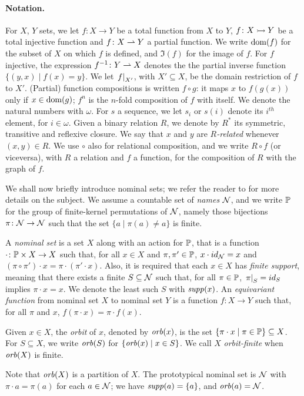 \paragraph{Notation.} For $X$, $Y$ sets, we let $f \colon X \to Y$ be a total function from $X$ to $Y$, $f \colon X \rightarrowtail Y$ be a total injective function and $f \colon X \rightharpoonup Y$ a partial function. We write $\operatorname{dom}(f)$ for the subset of $X$ on which $f$ is defined, and $\Im(f)$ for the image of $f$. For $f$ injective, the expression $f^{-1} \colon Y \rightharpoonup X$ denotes the the partial inverse function $\{(y,x) \mid f(x) = y \}$. We let $\left.f\right|_{X'}$, with $X' \subseteq X$, be the domain restriction of $f$ to $X'$. (Partial) function compositions is written $f \circ g$: it maps $x$ to $f(g(x))$ only if $x \in \operatorname{dom}(g)$; $f^n$ is the $n$-fold composition of $f$ with itself. We denote the natural numbers with $\omega$. For $s$ a sequence, we let $s_i$ or $s(i)$ denote its $i^{\mathit{th}}$ element, for $i \in \omega$. Given a binary relation $R$, we denote by $R^*$ its symmetric, transitive and reflexive closure. We say that $x$ and $y$ are \emph{$R$-related} whenever $(x,y) \in R$. We use $\circ$ also for relational composition, and we write $R \circ f$ (or viceversa), with $R$ a relation and $f$ a function, for the composition of $R$ with the graph of $f$.

We shall now briefly introduce nominal sets; we refer the reader to \cite{GP02} for more details on the subject. We assume a countable set of \emph{names} $\mathcal{N}$, and we write $\mathbb{P}$ for the group of finite-kernel permutations of $\mathcal{N}$, namely those bijections $\pi \colon \mathcal{N} \to \mathcal{N}$ such that the set $\{ a \mid \pi(a) \neq a \}$ is finite.
\begin{definition}
A \emph{nominal set} is a set $X$ along with an action for $\mathbb{P}$, that is a function $\cdot \colon \mathbb{P} \times X \to X$ such that, for all $x \in X$ and $\pi,\pi' \in \mathbb{P}$, $x \cdot id_{\mathcal{N}} = x$ and $(\pi \circ \pi') \cdot x = \pi \cdot (\pi' \cdot x)$. Also, it is required that each $x \in X$ has \emph{finite support}, meaning that there exists a finite $S \subseteq \mathcal{N}$ such that, for all $\pi \in \mathbb{P}$, $\left.\pi\right|_{S} = id_S$ implies $\pi \cdot x = x$. We denote the least such $S$ with $\mathit{supp}(x)$. An \emph{equivariant function} from nominal set $X$ to nominal set $Y$ is a function $f : X \to Y$ such that, for all $\pi$ and $x$, $f(\pi \cdot x) = \pi \cdot f(x)$.
\end{definition}
%
\begin{definition}
Given $x \in X$, the \emph{orbit} of $x$, denoted by $\mathit{orb}(x) $, is the set $\{ \pi \cdot x \mid \pi \in \mathbb{P}\} \subseteq X$. For $S \subseteq X$, we write $\mathit{orb}(S)$ for $\{ \mathit{orb}(x) \mid x \in S\}$. We call $X$ \emph{orbit-finite} when $\mathit{orb}(X)$ is finite.
\end{definition}

\noindent Note that $\mathit{orb}(X)$ is a partition of $X$. The prototypical nominal set is $\mathcal{N}$ with $\pi \cdot a = \pi(a)$ for each $a \in \mathcal{N}$; we have $\mathit{supp}(a) = \{a\}$, and $\mathit{orb}(a) = \mathcal{N}$.
